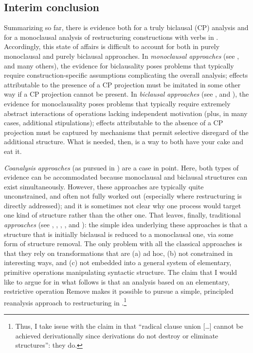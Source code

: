 \documentclass[output=paper]{langsci/langscibook}
\begin{document}
\subsection{Interim conclusion}

Summarizing so far, there is evidence both for a truly biclausal (CP) analysis
and for a monoclausal analysis of restructuring constructions with
 verbs in . Accordingly, this state of affairs is
difficult to account for both in purely monoclausal and purely biclausal
approaches. In {\itshape monoclausal approaches} (see
\citealt{Geilfuss:88,Haider:93,Haider:10,Kiss:95,Wurmbrand:01,Wurmbrand:07,Wurmbrand:15,Sternefeld:06},
and many others), the evidence for biclausality poses problems that typically
require construction-specific assumptions complicating the overall analysis;
effects attributable to the presence of a CP projection must be imitated in
some other way if a CP projection cannot be present. In {\itshape biclausal
approaches} (see
    \citealt{Baker1988,Sternefeld:90:pro,Mueller&Sternefeld:95,Sabel:96,Roberts:97:res,Hinterhoelzl:99},
    and \cite{Koopman&Szabolcsi:00}), the evidence for monoclausality poses
    problems that typically require extremely abstract interactions of
     operations lacking independent motivation (plus, in many
    cases, additional stipulations); effects attributable to the absence of a
    CP projection must be captured by mechanisms that permit selective
    disregard of the additional structure. What is needed, then, is a way to
    both have your cake and eat it.

{\itshape Coanalysis approaches} (as pursued in
\citealt{Huybregts:82,Bennis:83,Haegeman&Riemsdijk:86,DiSciullo&Williams:87,Sadock:91,Pesetsky:95})
are a case in point. Here, both types of evidence can be accommodated because
monoclausal and biclausal structures can exist simultaneously. However, these
approaches are typically quite unconstrained, and often not fully worked out
(especially where restructuring is directly addressed); and it is sometimes not
clear why one process would target one kind of structure rather than the other
one. That leaves, finally, traditional {\itshape {} approaches} (see
\citealt[Ch.~3]{Ross:67}, \citealt{Evers:75}, \citealt{Rizzi:82},
\citealt{Aissen&Perlmutter:83}, and \citealt{Stechow&Sternefeld:88}): the
simple idea underlying these approaches is that  a structure that is initially
biclausal is reduced to a monoclausal one, via some form of structure removal.
The only problem with all the classical  approaches is that they rely
on transformations that are (a) ad hoc, (b) not constrained in interesting
ways, and (c) not embedded into a general system of elementary, primitive
operations manipulating syntactic structure.  The claim that I would like to
argue for in what follows is that an analysis based on an elementary,
restrictive operation Remove makes it possible to pursue a simple, principled
reanalysis approach to restructuring in .\footnote{Thus, I take issue
    with the claim in \textcite[309]{Haider:10} that ``radical clause union
[\dots] cannot be achieved derivationally since derivations do not destroy or
eliminate structures'': they do.}
\end{document}
